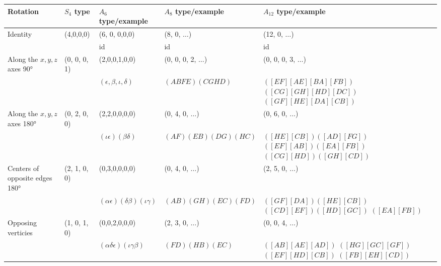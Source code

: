 \documentclass[a4paper]{article}
\begin{document}
\begin{tabular}{| l | l | l | l | p{35mm} |}
    \hline
    Rotation & $S_4$ type & $A_6$ type/example & $A_8$ type/example & $A_{12}$ type/example \\
    \hline 
    Identity & (4,0,0,0) & (6, 0, 0,0,0) & (8, 0, $\ldots$) & (12, 0, $\ldots$) \\
    \hline
    & & id & id & id \\
    \hline
   	Along the $x,y,z$ axes 90°& (0, 0, 0, 1) & (2,0,0,1,0,0) & (0, 0, 0, 2, $\ldots$) & (0, 0, 0, 3, $\ldots$)  \\
    \hline
    & & $(\epsilon, \beta, \iota, \delta)$ & $(ABFE)(CGHD)$ & $([EF][AE][BA][FB])$ $([CG][GH][HD][DC])$ $([GF][HE][DA][CB])$\\
    \hline
   	Along the $x,y,z$ axes 180°& (0, 2, 0, 0) & (2,2,0,0,0,0) & (0, 4, 0, $\ldots$) & (0, 6, 0, $\ldots$)  \\
    \hline
    & & $(\iota\epsilon)(\beta\delta)$ & $(AF)(EB)(DG)(HC)$ & $([HE][CB])([AD][FG])$ $([EF][AB])([EA][FB])$ $([CG][HD])([GH][CD])$ \\
   	\hline
   	Centers of opposite edges 180° & (2, 1, 0, 0) & (0,3,0,0,0,0) & (0, 4, 0, $\ldots$) & (2, 5, 0, $\ldots$)  \\
    \hline
    & & $(\alpha\epsilon)(\delta\beta)(\iota\gamma) $ & $(AB)(GH)(EC)(FD)$ & $([GF][DA])([HE][CB])$ $([CD][EF])([HD][GC])$ $([EA][FB])$\\
   	\hline
   	Opposing verticies & (1, 0, 1, 0) & (0,0,2,0,0,0) & (2, 3, 0, $\ldots$) & (0, 0, 4, $\ldots$)  \\
    \hline
    & & $(\alpha\delta\epsilon)(\iota\gamma\beta)$ & $(FD)(HB)(EC)$ & $([AB][AE][AD])$ $([HG][GC][GF])$ $([EF][HD][CB])$ $([FB][EH][CD])$\\
   	\hline
   	
\end{tabular}
\end{document}
